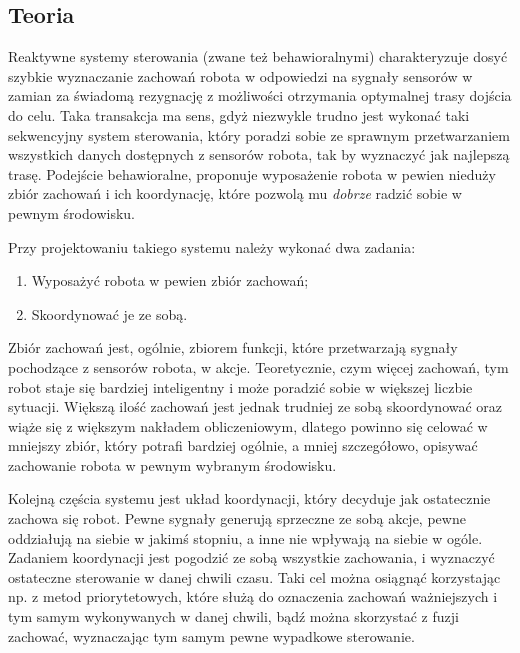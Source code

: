 \documentclass[11pt]{article}
\begin{document}
\subsection{Teoria}

Reaktywne systemy sterowania (zwane też behawioralnymi) charakteryzuje dosyć szybkie wyznaczanie zachowań robota w odpowiedzi na sygnały sensorów w zamian za świadomą rezygnację z możliwości otrzymania optymalnej trasy dojścia do celu. Taka transakcja ma sens, gdyż niezwykle trudno jest wykonać taki sekwencyjny system sterowania, który poradzi sobie ze sprawnym przetwarzaniem wszystkich danych dostępnych z sensorów robota, tak by wyznaczyć jak najlepszą trasę. Podejście behawioralne, proponuje wyposażenie robota w pewien nieduży zbiór zachowań i ich koordynację, które pozwolą mu \emph{dobrze} radzić sobie w pewnym środowisku.

Przy projektowaniu takiego systemu należy wykonać dwa zadania:
\begin{enumerate}
\item Wyposażyć robota w pewien zbiór zachowań;
\item Skoordynować je ze sobą.
\end{enumerate}

Zbiór zachowań jest, ogólnie, zbiorem funkcji, które przetwarzają sygnały pochodzące z sensorów robota, w akcje. Teoretycznie, czym więcej zachowań, tym robot staje się bardziej inteligentny i może poradzić sobie w większej liczbie sytuacji. Większą ilość zachowań jest jednak trudniej ze sobą skoordynować oraz wiąże się z większym nakładem obliczeniowym, dlatego powinno się celować w mniejszy zbiór, który potrafi bardziej ogólnie, a mniej szczegółowo, opisywać zachowanie robota w pewnym wybranym środowisku.

Kolejną częścia systemu jest układ koordynacji, który decyduje jak ostatecznie zachowa się robot. Pewne sygnały generują sprzeczne ze sobą akcje, pewne oddziałują na siebie w jakimś stopniu, a inne nie wpływają na siebie w ogóle. Zadaniem koordynacji jest pogodzić ze sobą wszystkie zachowania, i wyznaczyć ostateczne sterowanie w danej chwili czasu. Taki cel można osiągnąć korzystając np. z metod priorytetowych, które służą do oznaczenia zachowań ważniejszych i tym samym wykonywanych w danej chwili, bądź można skorzystać z fuzji zachować, wyznaczając tym samym pewne wypadkowe sterowanie.
\end{document}
